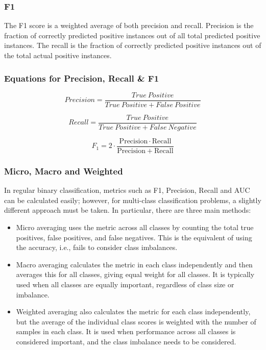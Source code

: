 \subsubsection*{F1}

The F1 score is a weighted average of both precision and recall. Precision is the fraction of correctly predicted positive instances out of all total predicted positive instances. The recall is the fraction of correctly predicted positive instances out of the total actual positive instances.

\subsubsection*{Equations for Precision, Recall \& F1} 

\begin{equation*} Precision = \frac{True\ Positive}{True\ Positive + False\ Positive} \end{equation*}

\begin{equation*} Recall = \frac{True\ Positive}{True\ Positive + False\ Negative} \end{equation*}

\begin{equation*}
F_1 = 2 \cdot \frac{\mathrm{Precision} \cdot \mathrm{Recall}}{\mathrm{Precision} + \mathrm{Recall}}
\end{equation*}

\subsubsection*{Micro, Macro and Weighted}

In regular binary classification, metrics such as F1, Precision, Recall and AUC can be calculated easily; however, for multi-class classification problems, a slightly different approach must be taken. In particular, there are three main methods:

\begin{itemize}
    \item Micro averaging uses the metric across all classes by counting the total true positives, false positives, and false negatives. This is the equivalent of using the accuracy, i.e., fails to consider class imbalances.
    \item Macro averaging calculates the metric in each class independently and then averages this for all classes, giving equal weight for all classes. It is typically used when all classes are equally important, regardless of class size or imbalance.
    \item Weighted averaging also calculates the metric for each class independently, but the average of the individual class scores is weighted with the number of samples in each class. It is used when performance across all classes is considered important, and the class imbalance needs to be considered.
\end{itemize}

